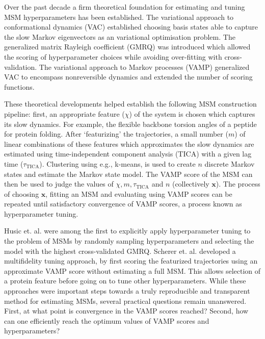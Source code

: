 \documentclass{article}
\begin{document}
Over the past decade  a firm theoretical foundation for estimating and tuning MSM hyperparameters has been established. The variational approach to conformational dynamics (VAC) established choosing  basis states able to capture the slow Markov eigenvectors as an variational optimisation problem. The generalized matrix Rayleigh coefficient (GMRQ) was introduced which allowed the scoring of hyperparameter choices while avoiding over-fitting with cross-validation. The variational approach to Markov processes (VAMP) generalized VAC to encompass nonreversible dynamics and extended the number of scoring functions. 

These theoretical developments helped establish the following MSM construction pipeline:  first, an appropriate feature ($\chi$) of the system is chosen which  captures its slow dynamics. For example, the flexible backbone torsion angles of a peptide for protein folding. After `featurizing' the trajectories, a small number ($m$) of linear combinations of these features which approximates the slow dynamics are estimated using  time-independent component analysis (TICA) with a given lag time ($\tau_{\mathrm{TICA}}$). Clustering using e.g., k-means, is used to create $n$ discrete Markov states and estimate the Markov state model. The VAMP score of the MSM can then be used to judge the values of $\chi, m, \tau_{\mathrm{TICA}}$ and $n$ (collectively $\mathbf{x}$). The process of choosing $\mathbf{x}$, fitting an MSM and evaluating using VAMP scores can be repeated until satisfactory convergence of VAMP scores, a process known as hyperparameter tuning. 

Husic et. al. were among the first to explicitly apply hyperparameter tuning to the problem of MSMs by randomly sampling hyperparameters and selecting the model with the highest cross-validated GMRQ. Scherer et. al. developed a multifidelity tuning approach, by first scoring the featurized trajectories using an approximate VAMP score without estimating a full MSM. This allows selection of a protein feature before going on to tune other hyperparameters. While these approaches were important steps towards a truly reproducible and transparent method for estimating MSMs, several practical questions remain unanswered. First, at what point is convergence in the VAMP scores reached? Second, how can one efficiently reach the optimum values of VAMP scores and hyperparameters? 
\end{document}
